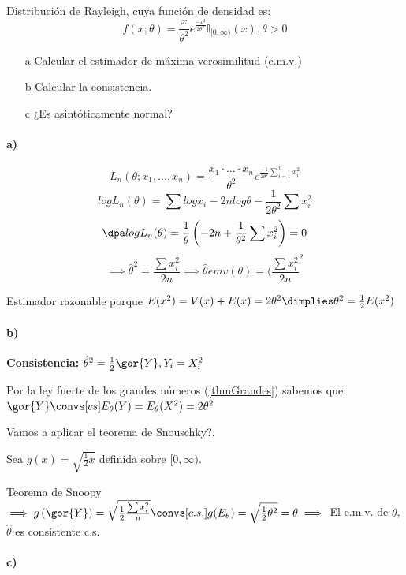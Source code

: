 \begin{problem}[5]
Distribución de Rayleigh, cuya función de densidad es:
\[f(x;\theta) = \frac{x}{\theta^2} e^{\frac{-x^2}{2\theta^2}} \mathbb{I}_{[0,\infty)} (x), \theta > 0\]

\begin{itemize}
\item[a]Calcular el estimador de máxima verosimilitud (e.m.v.)
\item[b]Calcular la consistencia.
\item[c] ¿Es asintóticamente normal?
\end{itemize}

\solution

\paragraph{a)}

\[L_n(\theta;x_1,...,x_n) = \frac{x_1 \cdot ... \cdot x_n}{\theta^2} e^{\frac{-1}{2\theta^2} \sum_{i=1}^n x_i^2}\]
\[log L_n(\theta) = \sum log x_i - 2nlog\theta -\frac{1}{2\theta^2}\sum x_i^2\]
\[\dpa log L_n(\theta) = \frac{1}{\theta} \left(-2n+\frac{1}{\theta^2}\sum x_i^2\right) = 0\]
\[\implies \hat{\theta}^2 = \frac{\sum x_i^2}{2n} \implies \hat{\theta} emv(\theta) = (\frac{\sum x_i^2}{2n}^2\]

Estimador razonable porque $E(x^2) = V(x) + E(x) = 2\theta^2 \dimplies \theta^2 = \frac{1}{2} E(x^2)$

\paragraph{b)}
\textbf{Consistencia:} $\hat{\theta}^2 = \frac{1}{2} \gor{Y}, Y_i = X_i^2$

Por la ley fuerte de los grandes números (\ref{thmGrandes}) sabemos que: $\gor{Y} \convs[cs] E_{\theta}(Y) = E_{\theta}(X^2) = 2\theta^2$

Vamos a aplicar el teorema de Snouschky?.

Sea $g(x) = \sqrt{\frac{1}{2}x}$ definida sobre $[0,\infty)$.

Teorema de Snoopy $\implies g\left(\gor{Y}\right) = \sqrt{\frac{1}{2} \frac{\sum x_i^2}{n}} \convs[c.s.] g(E_{\theta}) = \sqrt{\frac{1}{2}\theta^2} = \theta \implies $ El e.m.v. de $\theta$, $\hat{\theta}$ es consistente c.s.


\paragraph{c)}


\end{problem}
